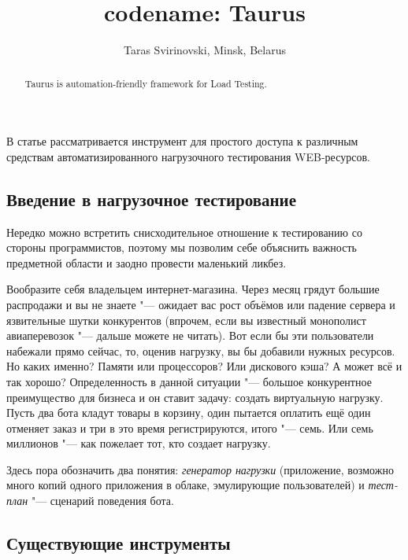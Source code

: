 \documentclass[10pt, a5paper]{article}
\begin{document}
\title{codename: Taurus}
\author{Taras Svirinovski, Minsk, Belarus}
\maketitle
\begin{abstract}
Taurus is automation-friendly framework for Load Testing.
\end{abstract}
В статье рассматривается инструмент для простого доступа к различным средствам автоматизированного нагрузочного тестирования WEB-ресурсов.

\subsection*{Введение в нагрузочное тестирование}
Нередко можно встретить снисходительное отношение к тестированию со стороны программистов, поэтому мы позволим себе объяснить важность предметной области и заодно провести маленький ликбез.

Вообразите себя владельцем интернет-магазина. Через месяц грядут большие распродажи и вы не знаете "--- ожидает вас рост объёмов или падение сервера и язвительные шутки конкурентов (впрочем, если вы известный монополист авиаперевозок "--- дальше можете не читать). Вот если бы эти пользователи набежали прямо сейчас, то, оценив нагрузку, вы бы добавили нужных ресурсов. Но каких именно? Памяти или процессоров? Или дискового кэша? А может всё и так хорошо?
Определенность в данной ситуации "--- большое конкурентное преимущество для бизнеса и он ставит задачу: создать виртуальную нагрузку. Пусть два бота кладут товары в корзину, один пытается оплатить ещё один отменяет заказ и три в это время регистрируются, итого "--- семь. Или семь миллионов "--- как пожелает тот, кто создает нагрузку.

Здесь пора обозначить два понятия: \emph{генератор нагрузки} (приложение, возможно много копий одного приложения в облаке, эмулирующие пользователей) и \emph{тест-план} "--- сценарий поведения бота.

\subsection*{Существующие инструменты}
\end{document}

